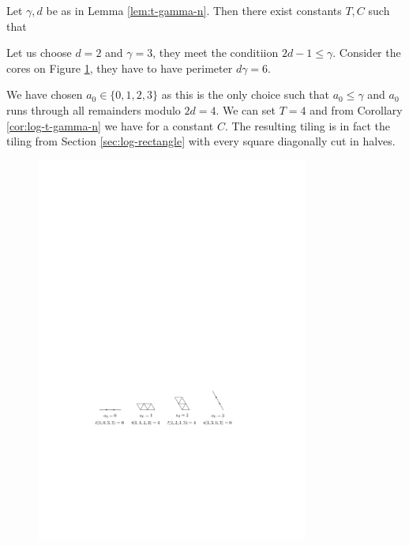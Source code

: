 \begin{cor}
\label{cor:log-t-gamma-n}
Let $\gamma,d$ be as in Lemma \ref{lem:t-gamma-n}. Then there exist constants $T,C$ such that
\end{cor}%

\begin{exmp}
Let us choose $d=2$ and $\gamma=3$, they meet the conditiion $2d-1 \leq \gamma$. Consider the cores on Figure \ref{fig:core-kk3}, they have to have perimeter $d\gamma = 6$.

We have chosen $a_0 \in \{0,1,2,3\}$ as this is the only choice such that $a_0 \leq \gamma$ and $a_0$ runs through all remainders modulo $2d=4$. We can set $T=4$ and from Corollary \ref{cor:log-t-gamma-n} we have
for a constant $C$. The resulting tiling is in fact the tiling from Section \ref{sec:log-rectangle}  with every square diagonally cut in halves.

\begin{figure}[htb]
\centering
\includegraphics[width=0.8\textwidth]{img/example_core_kk3.pdf}
\caption{}
\label{fig:core-kk3}
\end{figure}
\end{exmp}%

